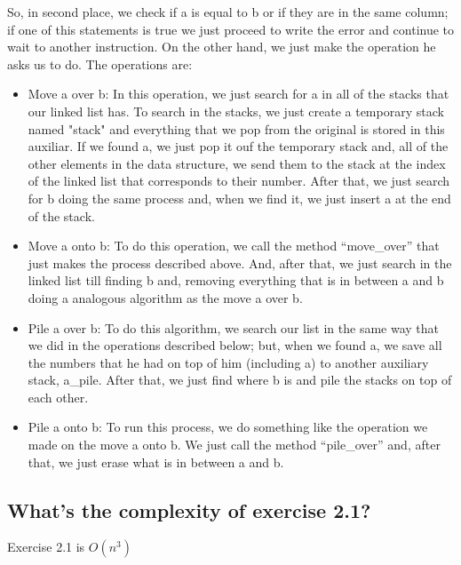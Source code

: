 \documentclass[a4paper,12pt]{article}
\begin{document}
    So, in second place, we check if a is equal to b or if they are in the same
    column; if one of this statements is true we just proceed to write the error
    and continue to wait to another instruction. On the other hand, we just make
    the operation he asks us to do. The operations are:
      \begin{itemize}
        \item Move a over b:
      In this operation, we just search for a in all of the stacks that our
      linked list has. To search in the stacks, we just create a temporary
      stack named "stack" and everything that we pop from the original is
      stored in this auxiliar. If we found a, we just pop it ouf the
      temporary stack and, all of the other elements in the data structure,
      we send them to the stack at the index of the linked list that
      corresponds to their number. After that, we just search for b doing
      the same process and, when we find it, we just insert a at the end of
      the stack.

      \item Move a onto b:
      To do this operation, we call the method ``move\_over'' that just makes
      the process described above. And, after that, we just search in the
      linked list till finding b and, removing everything that is in between
      a and b doing a analogous algorithm as the move a over b.

      \item Pile a over b:
      To do this algorithm, we search our list in the same way that we did
      in the operations described below; but, when we found a, we save all
      the numbers that he had on top of him (including a) to another
      auxiliary stack, a\_pile. After that, we just find where b is and
      pile the stacks on top of each other.

      \item Pile a onto b:
      To run this process, we do something like the operation we made on the
      move a onto b. We just call the method ``pile\_over'' and, after that,
      we just erase what is in between a and b.
      \end{itemize}

    \subsection{What's the complexity of exercise 2.1?}
    Exercise 2.1 is $O(n^3)$
\end{document}
